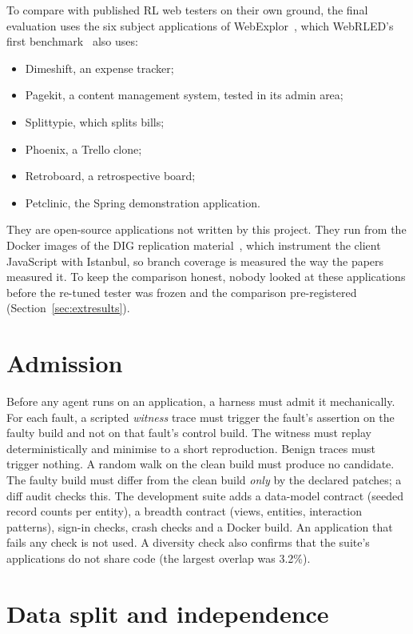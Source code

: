 To compare with published RL web testers on their own ground, the final evaluation uses the
six subject applications of WebExplor~\cite{zheng2021webexplor}, which WebRLED's first
benchmark~\cite{gu2025webrled} also uses:
\begin{itemize}[noitemsep]
  \item Dimeshift, an expense tracker;
  \item Pagekit, a content management system, tested in its admin area;
  \item Splittypie, which splits bills;
  \item Phoenix, a Trello clone;
  \item Retroboard, a retrospective board;
  \item Petclinic, the Spring demonstration application.
\end{itemize}
They are open-source applications not written by this project. They run from the Docker
images of the DIG replication material~\cite{biagiola2019diversity}, which instrument the
client JavaScript with Istanbul, so branch coverage is measured the way the papers measured
it. To keep the comparison honest, nobody looked at these applications before the re-tuned
tester was frozen and the comparison pre-registered (Section~\ref{sec:extresults}).

\section{Admission}
\label{sec:admission}

Before any agent runs on an application, a harness must admit it mechanically. For each
fault, a scripted \emph{witness} trace must trigger the fault's assertion on the faulty build
and not on that fault's control build. The witness must replay deterministically and
minimise to a short reproduction. Benign traces must trigger nothing. A random walk on the
clean build must produce no candidate. The faulty build must differ from the clean build
\emph{only} by the declared patches; a diff audit checks this. The development suite adds a
data-model contract (seeded record counts per entity), a breadth contract (views, entities,
interaction patterns), sign-in checks, crash checks and a Docker build. An application that
fails any check is not used. A diversity check also confirms that the suite's applications
do not share code (the largest overlap was 3.2\%).

\section{Data split and independence}
\label{sec:split}

